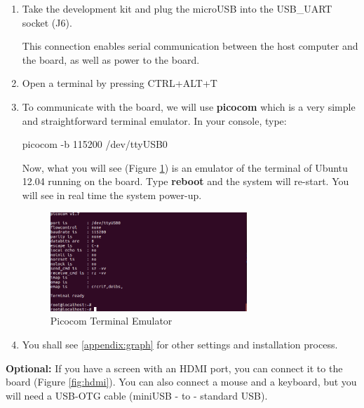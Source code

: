 \begin{enumerate}
    \item Take the development kit and plug the microUSB into the USB\_UART socket (J6).  

    This connection enables serial communication between the host computer and the board, as well as power to the board.
    
    \item Open a terminal by pressing CTRL+ALT+T
    \item To communicate with the board, we will use \textbf{picocom} which is a very simple and straightforward terminal emulator. In your console, type:
        \begin{tcolorbox}
            picocom -b 115200 /dev/ttyUSB0
        \end{tcolorbox}

    Now, what you will see (Figure \ref{fig:picocom}) is an emulator of the terminal of Ubuntu 12.04 running on the board.
    Type \textbf{reboot} and the system will re-start. You will see in real time the system power-up.

    \begin{figure}[h!]
    \centering
    \includegraphics[width=0.7\textwidth]{img/picocom.png}
    \caption{Picocom Terminal Emulator}
    \label{fig:picocom}
\end{figure}


    \item You shall see  \cref{appendix:graph} for other settings and installation process.
\end{enumerate}

{\color{red} \textbf{Optional:}} If you have a screen with an HDMI port, you can connect it to the board (Figure \ref{fig:hdmi}). You can also connect a mouse and a keyboard, but you will need a USB-OTG cable (miniUSB - to - standard USB).



